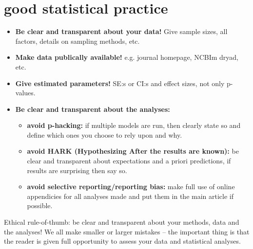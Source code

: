 \documentclass{article}
\begin{document}
\section{good statistical practice}
\begin{itemize}
    \item \textbf{Be clear and transparent about your data!} Give sample sizes, all factors, details on sampling methods, etc.
    \item \textbf{Make data publically available!} e.g. journal homepage, NCBIm dryad, etc.
    \item \textbf{Give estimated parameters!} SE:s or CI:s and effect sizes, not only p-values.
    \item \textbf{Be clear and transparent about the analyses:}
    \begin{itemize}
        \item \textbf{avoid p-hacking:} if multiple models are run, then clearly state so and define which ones you choose to rely upon and why.
        \item \textbf{avoid HARK (Hypothesizing After the results are known):} be clear and transparent about expectations and a priori predictions, if results are surprising then say so.
        \item \textbf{avoid selective reporting/reporting bias:} make full use of online appendicies for all analyses made and put them in the main article if possible.
    \end{itemize}
\end{itemize}
Ethical rule-of-thumb: be clear and transparent about your methods, data and the analyses! We all make smaller or larger mistakes – the important thing is that the reader is given full opportunity to assess your data and statistical analyses.
\end{document}
